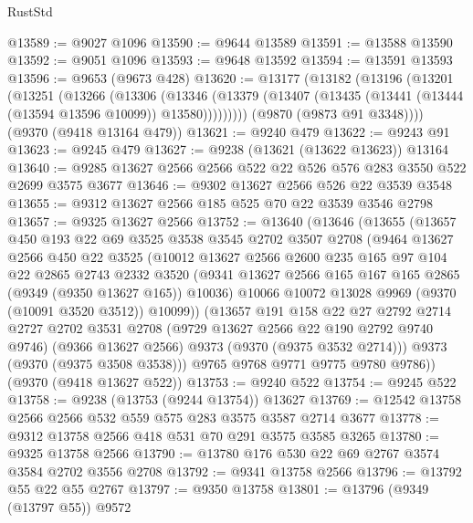 \begin{lexlean}{RustStd}
\begin{coremodule}
@13589 := @9027 @1096
@13590 := @9644 @13589
@13591 := @13588 @13590
@13592 := @9051 @1096
@13593 := @9648 @13592
@13594 := @13591 @13593
@13596 := @9653 (@9673 @428)
@13620 := @13177
    (@13182
      (@13196
        (@13201
          (@13251
            (@13266
              (@13306
                (@13346
                  (@13379 (@13407 (@13435 (@13441 (@13444 (@13594 @13596 @10099)) @13580)))))))))
        (@9870 (@9873 @91 @3348))))
    (@9370 (@9418 @13164 @479))
@13621 := @9240 @479
@13622 := @9243 @91
@13623 := @9245 @479
@13627 := @9238 (@13621 (@13622 @13623)) @13164
@13640 := @9285 @13627 @2566 @2566 @522 @22 @526 @576 @283 @3550 @522 @2699 @3575 @3677
@13646 := @9302 @13627 @2566 @526 @22 @3539 @3548
@13655 := @9312 @13627 @2566 @185 @525 @70 @22 @3539 @3546 @2798
@13657 := @9325 @13627 @2566
@13752 := @13640
    (@13646
      (@13655
        (@13657
          @450
          @193
          @22
          @69
          @3525
          @3538
          @3545
          @2702
          @3507
          @2708
          (@9464
            @13627
            @2566
            @450
            @22
            @3525
            (@10012
              @13627
              @2566
              @2600
              @235
              @165
              @97
              @104
              @22
              @2865
              @2743
              @2332
              @3520
              (@9341 @13627 @2566 @165 @167 @165 @2865 (@9349 (@9350 @13627 @165)) @10036)
              @10066
              @10072
              @13028
              @9969
              (@9370 (@10091 @3520 @3512))
              @10099))
          (@13657
            @191
            @158
            @22
            @27
            @2792
            @2714
            @2727
            @2702
            @3531
            @2708
            (@9729 @13627 @2566 @22 @190 @2792 @9740 @9746)
            (@9366 @13627 @2566)
            @9373
            (@9370 (@9375 @3532 @2714)))
          @9373
          (@9370 (@9375 @3508 @3538)))
        @9765
        @9768
        @9771
        @9775
        @9780
        @9786))
    (@9370 (@9418 @13627 @522))
@13753 := @9240 @522
@13754 := @9245 @522
@13758 := @9238 (@13753 (@9244 @13754)) @13627
@13769 := @12542 @13758 @2566 @2566 @532 @559 @575 @283 @3575 @3587 @2714 @3677
@13778 := @9312 @13758 @2566 @418 @531 @70 @291 @3575 @3585 @3265
@13780 := @9325 @13758 @2566
@13790 := @13780 @176 @530 @22 @69 @2767 @3574 @3584 @2702 @3556 @2708
@13792 := @9341 @13758 @2566
@13796 := @13792 @55 @22 @55 @2767
@13797 := @9350 @13758
@13801 := @13796 (@9349 (@13797 @55)) @9572

\end{coremodule}
\end{lexlean}
